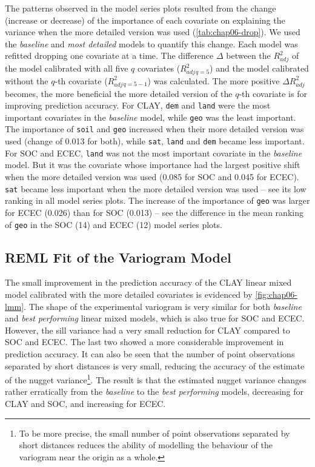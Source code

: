 The patterns observed in the model series plots resulted from the change (increase or decrease) of the 
importance of each covariate on explaining the variance when the more detailed version was used 
(\autoref{tab:chap06-drop}). We used the \emph{baseline} and \emph{most detailed} models to quantify this 
change. Each model was refitted dropping one covariate at a time. The difference $\Delta$ between the 
${R}^{2}_{adj}$ of the model calibrated with all five $q$ covariates (${R}^{2}_{adj}{}_{q = 5}$) and the model 
calibrated without the $q$-th covariate ($R^{2}_{adj}{}_{q = 5 - 1}$) was calculated. The more positive 
$\Delta{R}^{2}_{adj}$ becomes, the more beneficial the more detailed version of the $q$-th covariate is for 
improving prediction accuracy. For CLAY, \texttt{dem} and \texttt{land} were the most important covariates in 
the \emph{baseline} model, while \texttt{geo} was the least important. The importance of \texttt{soil} and 
\texttt{geo} increased when their more detailed version was used (change of \SI{+0.013}{\pp} for both), while 
\texttt{sat}, \texttt{land} and \texttt{dem} became less important. For SOC and ECEC, \texttt{land} was not 
the most important covariate in the \emph{baseline} model. But it was the covariate whose importance had the 
largest positive shift when the more detailed version was used (\SI{+0.085}{\pp} for SOC and \SI{+0.045}{\pp}
for ECEC). \texttt{sat} became less important when the more detailed version was used -- see its low ranking 
in all model series plots. The increase of the importance of \texttt{geo} was larger for ECEC 
(\SI{+0.026}{\pp}) than for SOC (\SI{+0.013}{\pp}) -- see the difference in the mean ranking of \texttt{geo} 
in the SOC (\num{14}) and ECEC (\num{12}) model series plots.



\subsection{REML Fit of the Variogram Model}

\def\footnugget{\footnote{To be more precise, the small number of point observations separated by short 
distances reduces the ability of modelling the behaviour of the variogram near the origin as a whole.}}

The small improvement in the prediction accuracy of the CLAY linear mixed model calibrated with the more 
detailed covariates is evidenced by \autoref{fig:chap06-lmm}. The shape of the experimental variogram is very 
similar for both \emph{baseline} and \emph{best performing} linear mixed models, which is also true for SOC 
and ECEC. However, the sill variance had a very small reduction for CLAY compared to SOC and ECEC. The last 
two showed a more considerable improvement in prediction accuracy. It can also be seen that the number of 
point observations separated by short distances is very small, reducing the accuracy of the estimate of the 
nugget variance\footnugget{}. The result is that the estimated nugget variance changes rather erratically 
from the \emph{baseline} to the \emph{best performing} models, decreasing for CLAY and SOC, and increasing 
for ECEC.

